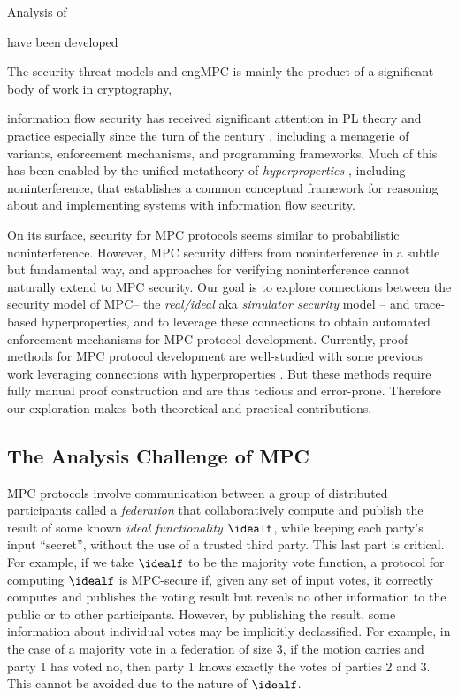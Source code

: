 Analysis of 
 
have been developed 

The security
threat models and engMPC is mainly the
product of a significant body of work in cryptography, 


information flow security has received
significant attention in PL theory and practice especially since the
turn of the century \cite{1159651}, including a menagerie of variants,
enforcement mechanisms, and programming frameworks. Much of this has
been enabled by the unified metatheory of \emph{hyperproperties}
\cite{10.5555/1891823.1891830}, including noninterference, that
establishes a common conceptual framework for reasoning about and
implementing systems with information flow security.

On its surface, security for MPC protocols seems similar to
probabilistic noninterference. However, MPC security differs from
noninterference in a subtle but fundamental way, and approaches for
verifying noninterference cannot naturally extend to MPC security. Our
goal is to explore connections between the security model of MPC-- the
\emph{real/ideal} aka \emph{simulator security} model -- and
trace-based hyperproperties, and to leverage these connections to
obtain automated enforcement mechanisms for MPC protocol
development. Currently, proof methods for MPC protocol development are
well-studied \cite{Lindell2017} with some previous work leveraging
connections with hyperproperties \cite{8429300}. But these methods
require fully manual proof construction and are thus tedious and
error-prone. Therefore our exploration makes both theoretical and
practical contributions.

\subsection{The Analysis Challenge of MPC}
MPC protocols involve communication
between a group of distributed participants called a \emph{federation}
that collaboratively compute and publish the result of some known
\emph{ideal functionality} $\idealf$, while keeping each party's input
``secret'', without the use of a trusted third party. This last part
is critical. For example, if we take $\idealf$ to be the majority vote
function, a protocol for computing $\idealf$ is MPC-secure if, given
any set of input votes, it correctly computes and publishes the voting
result but reveals no other information to the public or to other
participants. However, by publishing the result, some information
about individual votes may be implicitly declassified.  For example,
in the case of a majority vote in a federation of size 3, if the
motion carries and party 1 has voted no, then party 1 knows exactly
the votes of parties 2 and 3. This cannot be avoided due to the nature
of $\idealf$.


